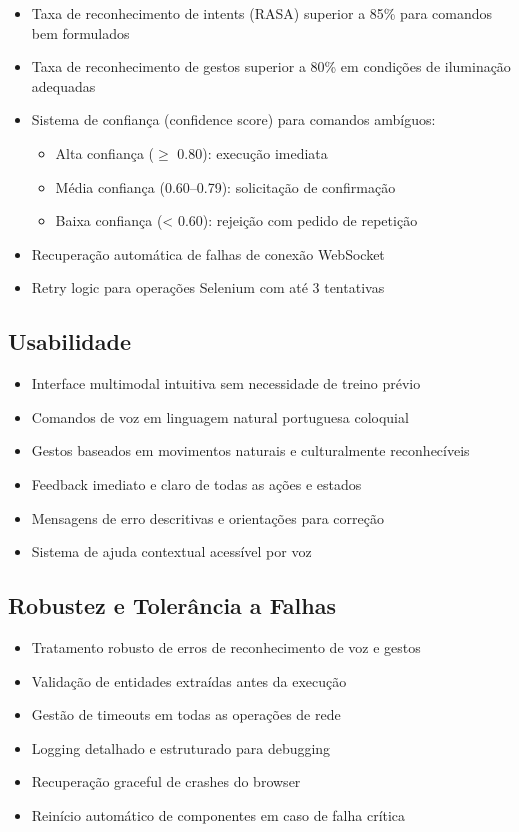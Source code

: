 \begin{itemize}
    \item Taxa de reconhecimento de intents (RASA) superior a 85\% para comandos bem formulados
    \item Taxa de reconhecimento de gestos superior a 80\% em condições de iluminação adequadas
    \item Sistema de confiança (confidence score) para comandos ambíguos:
    \begin{itemize}
        \item Alta confiança ($\geq$ 0.80): execução imediata
        \item Média confiança (0.60--0.79): solicitação de confirmação
        \item Baixa confiança (< 0.60): rejeição com pedido de repetição
    \end{itemize}
    \item Recuperação automática de falhas de conexão WebSocket
    \item Retry logic para operações Selenium com até 3 tentativas
\end{itemize}

\subsection{Usabilidade}

\begin{itemize}
    \item Interface multimodal intuitiva sem necessidade de treino prévio
    \item Comandos de voz em linguagem natural portuguesa coloquial
    \item Gestos baseados em movimentos naturais e culturalmente reconhecíveis
    \item Feedback imediato e claro de todas as ações e estados
    \item Mensagens de erro descritivas e orientações para correção
    \item Sistema de ajuda contextual acessível por voz
\end{itemize}

\subsection{Robustez e Tolerância a Falhas}

\begin{itemize}
    \item Tratamento robusto de erros de reconhecimento de voz e gestos
    \item Validação de entidades extraídas antes da execução
    \item Gestão de timeouts em todas as operações de rede
    \item Logging detalhado e estruturado para debugging
    \item Recuperação graceful de crashes do browser
    \item Reinício automático de componentes em caso de falha crítica
\end{itemize}

